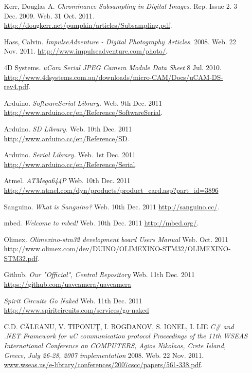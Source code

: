 \begin{thebibliography}{9}
	 Kerr, Douglas A. \emph{Chrominance Subsampling in Digital Images}. Rep. Issue 2. 3 Dec. 2009. Web. 31 Oct. 2011. \url{http://dougkerr.net/pumpkin/articles/Subsampling.pdf}.
	
	 Hass, Calvin. \emph{ImpulseAdventure - Digital Photography Articles.} 2008. Web. 22 Nov. 2011. \url{http://www.impulseadventure.com/photo/}.
	
	 4D Systems. \emph{uCam Serial JPEG Camera Module Data Sheet} 8 Jul. 2010. \url{http://www.4dsystems.com.au/downloads/micro-CAM/Docs/uCAM-DS-rev4.pdf}.

	 Arduino. \emph{SoftwareSerial Library.} Web. 9th Dec. 2011 \url{http://www.arduino.cc/en/Reference/SoftwareSerial}.

	 Arduino. \emph{SD Library.} Web. 10th Dec. 2011 \url{http://www.arduino.cc/en/Reference/SD}.
	
	 Arduino. \emph{Serial Library.} Web. 1st Dec. 2011 \url{http://www.arduino.cc/en/Reference/Serial}.

	 Atmel. \emph{ATMega644P} Web. 10th Dec. 2011 \url{http://www.atmel.com/dyn/products/product_card.asp?part_id=3896}

	 Sanguino. \emph{What is Sanguino?} Web. 10th Dec. 2011 \url{http://sanguino.cc/}.

	 mbed. \emph{Welcome to mbed!} Web. 10th Dec. 2011 \url{http://mbed.org/}.

	 Olimex. \emph{Olimexino-stm32 development board Users Manual} Web. Oct. 2011 \url{http://www.olimex.com/dev/DUINO/OLIMEXINO-STM32/OLIMEXINO-STM32.pdf}.

	 Github. \emph{Our "Official", Central Repository} Web. 11th Dec. 2011 \url{https://github.com/uavcamera/uavcamera}

	 \emph{Spirit Circuits Go Naked} Web. 11th Dec. 2011 \url{http://www.spiritcircuits.com/services/go-naked}
	
	 C.D. CĂLEANU, V. TIPONUŢ, I. BOGDANOV, S. IONEL, I. LIE \emph{C\# and .NET Framework for uC communication protocol Proceedings of the 11th WSEAS International Conference on COMPUTERS, Agios Nikolaos, Crete Island, Greece, July 26-28, 2007
implementation} 2008. Web. 22 Nov. 2011.
\url{www.wseas.us/e-library/conferences/2007cscc/papers/561-338.pdf}.


\end{thebibliography}
